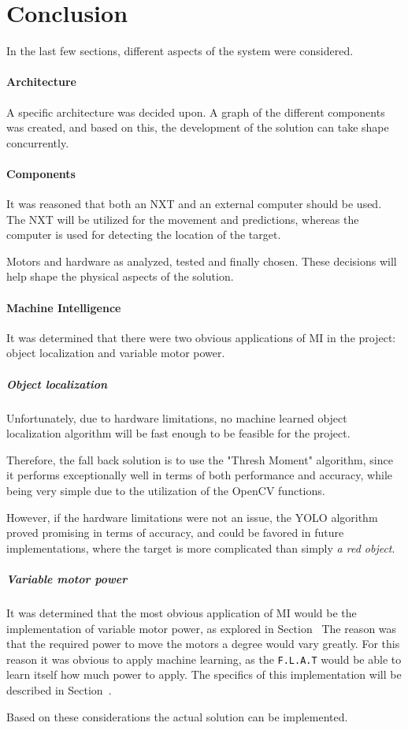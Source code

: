 \section{Conclusion}
In the last few sections, different aspects of the system were considered.

\paragraph{Architecture}
A specific architecture was decided upon.
A graph of the different components was created, and based on this, the development of the solution can take shape concurrently.


\paragraph{Components}
It was reasoned that both an NXT and an external computer should be used.
The NXT will be utilized for the movement and predictions, whereas the computer is used for detecting the location of the target.


Motors and hardware as analyzed, tested and finally chosen.
These decisions will help shape the physical aspects of the solution.


\paragraph{Machine Intelligence}
It was determined that there were two obvious applications of MI in the project: object localization and variable motor power.

\subparagraph{Object localization}
Unfortunately, due to hardware limitations, no machine learned object localization algorithm will be fast enough to be feasible for the project.

Therefore, the fall back solution is to use the "Thresh Moment" algorithm, since it performs exceptionally well in terms of both performance and accuracy, while being very simple due to the utilization of the OpenCV functions.

However, if the hardware limitations were not an issue, the YOLO algorithm proved promising in terms of accuracy, and could be favored in future implementations, where the target is more complicated than simply \textit{a red object}.

\subparagraph{Variable motor power}
It was determined that the most obvious application of MI would be the implementation of variable motor power, as explored in Section~
The reason was that the required power to move the motors a degree would vary greatly.
For this reason it was obvious to apply machine learning, as the \texttt{F.L.A.T} would be able to learn itself how much power to apply.
The specifics of this implementation will be described in Section~.


Based on these considerations the actual solution can be implemented.
